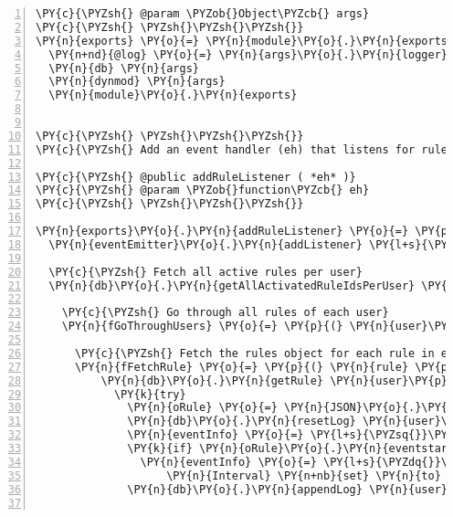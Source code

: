 \begin{Verbatim}[fontsize=\scriptsize,commandchars=\\\{\},numbers=left,firstnumber=1,stepnumber=1]
\PY{c}{\PYZsh{} @param \PYZob{}Object\PYZcb{} args}
\PY{c}{\PYZsh{} \PYZsh{}\PYZsh{}\PYZsh{}}
\PY{n}{exports} \PY{o}{=} \PY{n}{module}\PY{o}{.}\PY{n}{exports} \PY{o}{=} \PY{p}{(} \PY{n}{args} \PY{p}{)} \PY{o}{=}\PY{o}{\PYZgt{}}
  \PY{n+nd}{@log} \PY{o}{=} \PY{n}{args}\PY{o}{.}\PY{n}{logger}
  \PY{n}{db} \PY{n}{args}
  \PY{n}{dynmod} \PY{n}{args}
  \PY{n}{module}\PY{o}{.}\PY{n}{exports}


\PY{c}{\PYZsh{} \PYZsh{}\PYZsh{}\PYZsh{}}
\PY{c}{\PYZsh{} Add an event handler (eh) that listens for rules.}

\PY{c}{\PYZsh{} @public addRuleListener ( *eh* )}
\PY{c}{\PYZsh{} @param \PYZob{}function\PYZcb{} eh}
\PY{c}{\PYZsh{} \PYZsh{}\PYZsh{}\PYZsh{}}

\PY{n}{exports}\PY{o}{.}\PY{n}{addRuleListener} \PY{o}{=} \PY{p}{(} \PY{n}{eh} \PY{p}{)} \PY{o}{=}\PY{o}{\PYZgt{}}
  \PY{n}{eventEmitter}\PY{o}{.}\PY{n}{addListener} \PY{l+s}{\PYZsq{}}\PY{l+s}{rule}\PY{l+s}{\PYZsq{}}\PY{p}{,} \PY{n}{eh}

  \PY{c}{\PYZsh{} Fetch all active rules per user}
  \PY{n}{db}\PY{o}{.}\PY{n}{getAllActivatedRuleIdsPerUser} \PY{p}{(} \PY{n}{err}\PY{p}{,} \PY{n}{objUsers} \PY{p}{)} \PY{o}{=}\PY{o}{\PYZgt{}}
    
    \PY{c}{\PYZsh{} Go through all rules of each user}
    \PY{n}{fGoThroughUsers} \PY{o}{=} \PY{p}{(} \PY{n}{user}\PY{p}{,} \PY{n}{rules} \PY{p}{)} \PY{o}{=}\PY{o}{\PYZgt{}}

      \PY{c}{\PYZsh{} Fetch the rules object for each rule in each user}
      \PY{n}{fFetchRule} \PY{o}{=} \PY{p}{(} \PY{n}{rule} \PY{p}{)} \PY{o}{=}\PY{o}{\PYZgt{}}
          \PY{n}{db}\PY{o}{.}\PY{n}{getRule} \PY{n}{user}\PY{p}{,} \PY{n}{rule}\PY{p}{,} \PY{p}{(} \PY{n}{err}\PY{p}{,} \PY{n}{strRule} \PY{p}{)} \PY{o}{=}\PY{o}{\PYZgt{}}
            \PY{k}{try} 
              \PY{n}{oRule} \PY{o}{=} \PY{n}{JSON}\PY{o}{.}\PY{n}{parse} \PY{n}{strRule}
              \PY{n}{db}\PY{o}{.}\PY{n}{resetLog} \PY{n}{user}\PY{p}{,} \PY{n}{oRule}\PY{o}{.}\PY{n}{id}
              \PY{n}{eventInfo} \PY{o}{=} \PY{l+s}{\PYZsq{}}\PY{l+s}{\PYZsq{}}
              \PY{k}{if} \PY{n}{oRule}\PY{o}{.}\PY{n}{eventstart}
                \PY{n}{eventInfo} \PY{o}{=} \PY{l+s}{\PYZdq{}}\PY{l+s}{Starting at \PYZsh{}\PYZob{} new Date( oRule.eventstart ) \PYZcb{},}
                    \PY{n}{Interval} \PY{n+nb}{set} \PY{n}{to} \PY{c}{\PYZsh{}\PYZob{} oRule.eventinterval \PYZcb{} minutes\PYZdq{}}
              \PY{n}{db}\PY{o}{.}\PY{n}{appendLog} \PY{n}{user}\PY{p}{,} \PY{n}{oRule}\PY{o}{.}\PY{n}{id}\PY{p}{,} \PY{l+s}{\PYZdq{}}\PY{l+s}{INIT}\PY{l+s}{\PYZdq{}}\PY{p}{,} \PY{l+s}{\PYZdq{}}\PY{l+s}{Rule }\PY{l+s}{\PYZsq{}}\PY{l+s}{\PYZsh{}\PYZob{} oRule.id \PYZcb{}}\PY{l+s}{\PYZsq{}}\PY{l+s}{ initialized. \PYZsh{}\PYZob{} eventInfo \PYZcb{}}\PY{l+s}{\PYZdq{}}


\end{Verbatim}
